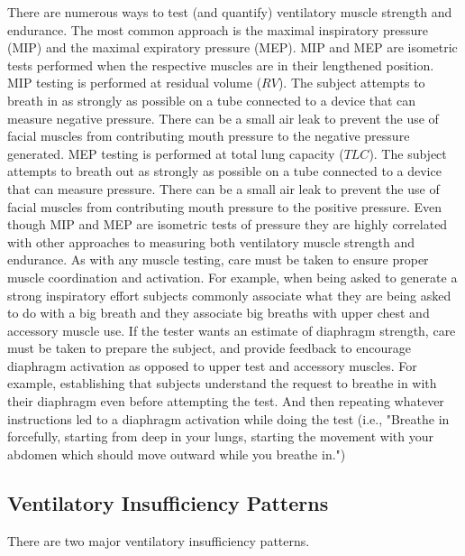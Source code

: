 There are numerous ways to test (and quantify) ventilatory muscle strength and endurance. The most common approach is the maximal inspiratory pressure (MIP) and the maximal expiratory pressure (MEP). MIP and MEP are isometric tests performed when the respective muscles are in their lengthened position. 
MIP testing is performed at residual volume ($RV$). The subject attempts to breath in as strongly as possible on a tube connected to a device that can measure negative pressure. There can be a small air leak to prevent the use of facial muscles from contributing mouth pressure to the negative pressure generated. 
MEP testing is performed at total lung capacity ($TLC$). The subject attempts to breath out as strongly as possible on a tube connected to a device that can measure pressure. There can be a small air leak to prevent the use of facial muscles from contributing mouth pressure to the positive pressure.
Even though MIP and MEP are isometric tests of pressure they are highly correlated with other approaches to measuring both ventilatory muscle strength and endurance. As with any muscle testing, care must be taken to ensure proper muscle coordination and activation. For example, when being asked to generate a strong inspiratory effort subjects commonly associate what they are being asked to do with a big breath and they associate big breaths with upper chest and accessory muscle use. If the tester wants an estimate of diaphragm strength, care must be taken to prepare the subject, and provide feedback to encourage diaphragm activation as opposed to upper test and accessory muscles. For example, establishing that subjects understand the request to breathe in with their diaphragm even before attempting the test. And then repeating whatever instructions led to a diaphragm activation while doing the test (i.e., "Breathe in forcefully, starting from deep in your lungs, starting the movement with your abdomen which should move outward while you breathe in.")

\subsection{Ventilatory Insufficiency Patterns}

There are two major ventilatory insufficiency patterns. 

